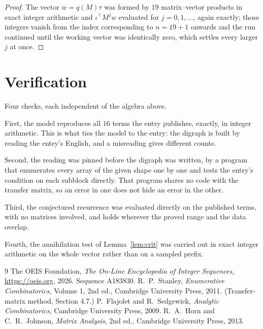 \documentclass[11pt,a4paper]{article}
\theoremstyle{plain}
\theoremstyle{definition}
\begin{document}
\begin{proof}
The vector $w=q(M)\tau$ was formed by $19$ matrix--vector products in exact integer
arithmetic and $\iota^{\!\top}M^{j}w$ evaluated for $j=0,1,\dots$, again exactly; those
integers vanish from the index corresponding to $n=19+1$ onwards and the run continued
until the working vector was identically zero, which settles every larger $j$ at once.
\end{proof}

\section{Verification}

Four checks, each independent of the algebra above.

First, the model reproduces all $16$ terms the entry publishes, exactly, in integer
arithmetic. This is what ties the model to the entry: the digraph is built by reading the
entry's English, and a misreading gives different counts.

Second, the reading was pinned before the digraph was written, by a program that enumerates
every array of the given shape one by one and tests the entry's condition on each subblock
directly. That program shares no code with the transfer matrix, so an error in one does not
hide an error in the other.

Third, the conjectured recurrence was evaluated directly on the published terms, with no
matrices involved, and holds wherever the proved range and the data overlap.

Fourth, the annihilation test of Lemma~\ref{lem:crit} was carried out in exact integer
arithmetic on the whole vector rather than on a sampled prefix.

\begin{thebibliography}{9}
 The OEIS Foundation, \emph{The On-Line Encyclopedia of Integer
Sequences}, \url{https://oeis.org}, 2026. Sequence A183830.
 R.~P.~Stanley, \emph{Enumerative Combinatorics}, Volume 1, 2nd ed.,
Cambridge University Press, 2011. (Transfer-matrix method, Section 4.7.)
 P.~Flajolet and R.~Sedgewick, \emph{Analytic Combinatorics}, Cambridge
University Press, 2009.
 R.~A.~Horn and C.~R.~Johnson, \emph{Matrix Analysis}, 2nd ed., Cambridge
University Press, 2013.
\end{thebibliography}
\end{document}
